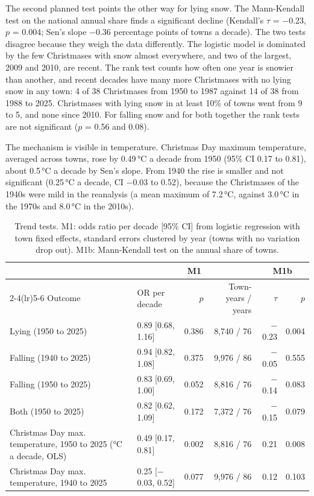 \documentclass[11pt,a4paper]{article}
\begin{document}
The second planned test points the other way for lying snow. The Mann-Kendall test on the national annual share finds a significant decline (Kendall's $\tau$ = $-$0.23, $p$ = 0.004; Sen's slope $-$0.36 percentage points of towns a decade). The two tests disagree because they weigh the data differently. The logistic model is dominated by the few Christmases with snow almost everywhere, and two of the largest, 2009 and 2010, are recent. The rank test counts how often one year is snowier than another, and recent decades have many more Christmases with no lying snow in any town: 4 of 38 Christmases from 1950 to 1987 against 14 of 38 from 1988 to 2025. Christmases with lying snow in at least 10\% of towns went from 9 to 5, and none since 2010. For falling snow and for both together the rank tests are not significant ($p$ = 0.56 and 0.08).

The mechanism is visible in temperature. Christmas Day maximum temperature, averaged across towns, rose by 0.49\,°C a decade from 1950 (95\% CI 0.17 to 0.81), about 0.5\,°C a decade by Sen's slope. From 1940 the rise is smaller and not significant (0.25\,°C a decade, CI $-$0.03 to 0.52), because the Christmases of the 1940s were mild in the reanalysis (a mean maximum of 7.2\,°C, against 3.0\,°C in the 1970s and 8.0\,°C in the 2010s).

\begin{table}[tbp]\centering\small\caption{Trend tests. M1: odds ratio per decade [95\% CI] from logistic regression with town fixed effects, standard errors clustered by year (towns with no variation drop out). M1b: Mann-Kendall test on the annual share of towns.}\label{tab:trend}\begin{tabular}{p{4.4cm}lrrrr}\toprule & \multicolumn{3}{c}{M1} & \multicolumn{2}{c}{M1b}\\\cmidrule(lr){2-4}\cmidrule(lr){5-6} Outcome & OR per decade & $p$ & Town-years / years & $\tau$ & $p$\\\midrule
Lying (1950 to 2025) & 0.89 [0.68, 1.16] & 0.386 & 8,740 / 76 & $-$0.23 & 0.004\\
Falling (1940 to 2025) & 0.94 [0.82, 1.08] & 0.375 & 9,976 / 86 & $-$0.05 & 0.555\\
Falling (1950 to 2025) & 0.83 [0.69, 1.00] & 0.052 & 8,816 / 76 & $-$0.14 & 0.083\\
Both (1950 to 2025) & 0.82 [0.62, 1.09] & 0.172 & 7,372 / 76 & $-$0.15 & 0.079\\
\midrule Christmas Day max. temperature, 1950 to 2025 (°C a decade, OLS) & 0.49 [0.17, 0.81] & 0.002 & 8,816 / 76 & 0.21 & 0.008\\
Christmas Day max. temperature, 1940 to 2025 & 0.25 [$-$0.03, 0.52] & 0.077 & 9,976 / 86 & 0.12 & 0.103\\
\bottomrule\end{tabular}\end{table}
\end{document}
